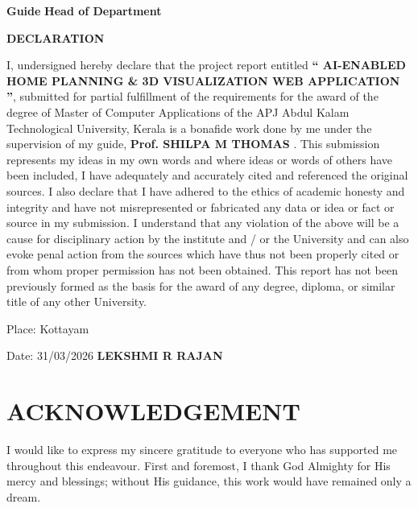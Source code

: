 \documentclass[12pt]{report}
\begin{document}
\vspace{3cm}
\hspace{-1.3em}\textbf{Guide}   \hfill \textbf{Head of Department}

\vspace{2cm}

\clearpage
\pagestyle{plain}
 \setcounter{page}{1}
\begin{center}
{\Large{\bf{DECLARATION}}}
\end{center}

\noindent
 \hspace{.5cm}I, undersigned hereby declare that the project report entitled \textbf {`` AI-ENABLED HOME PLANNING \& 3D VISUALIZATION WEB APPLICATION ''}, submitted for partial fulfillment of the requirements for the award of the degree of Master of Computer Applications of the APJ Abdul Kalam Technological University, Kerala is a bonafide work done by me under the supervision of my guide,  
 \textbf {Prof. SHILPA M THOMAS } . This submission represents my ideas in my own words and where ideas or words of others have been included, I have adequately and accurately cited and referenced the original sources. I also declare that I have adhered to the ethics of academic honesty and integrity and have not misrepresented or fabricated any data or idea or fact or source in my submission. I understand that any violation of the above will be a cause for disciplinary action by the institute and / or the University and can also evoke penal action from the sources which have thus not been properly cited or from whom proper permission has not been obtained. This report has not been previously formed as the basis for the award of any degree, diploma, or similar title of any other University.
\vspace{4cm}

\noindent Place: Kottayam 

\noindent Date: 31/03/2026 \hfill \textbf{LEKSHMI R RAJAN}

\clearpage

\chapter*{ACKNOWLEDGEMENT}

\par I would like to express my sincere gratitude to everyone who has supported me throughout this endeavour. First and foremost, I thank God Almighty for His mercy and blessings; without His guidance, this work would have remained only a dream.
\end{document}
